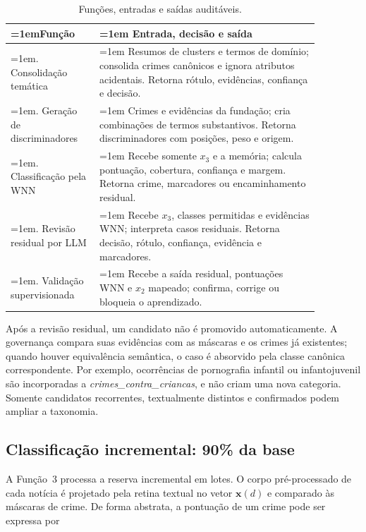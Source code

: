 \begin{table}[ht]
\centering
\caption{Funções, entradas e saídas auditáveis.}
\label{tab:funcoes-instrucoes}
\begin{tabular}{>{\hyphenpenalty=10000\exhyphenpenalty=10000\emergencystretch=1em\arraybackslash}p{0.25\linewidth}>{\hyphenpenalty=10000\exhyphenpenalty=10000\emergencystretch=1em\arraybackslash}p{0.62\linewidth}}
\hline
\textbf{Função} & \textbf{Entrada, decisão e saída} \\
\hline
1. Consolidação temática & Resumos de clusters e termos de domínio; consolida crimes canônicos e ignora atributos acidentais. Retorna rótulo, evidências, confiança e decisão. \\
2. Geração de discriminadores & Crimes e evidências da fundação; cria combinações de termos substantivos. Retorna discriminadores com posições, peso e origem. \\
3. Classificação pela WNN & Recebe somente $x_3$ e a memória; calcula pontuação, cobertura, confiança e margem. Retorna crime, marcadores ou encaminhamento residual. \\
4. Revisão residual por LLM & Recebe $x_3$, classes permitidas e evidências WNN; interpreta casos residuais. Retorna decisão, rótulo, confiança, evidência e marcadores. \\
5. Validação supervisionada & Recebe a saída residual, pontuações WNN e $x_2$ mapeado; confirma, corrige ou bloqueia o aprendizado. \\
\hline
\end{tabular}
\end{table}

Após a revisão residual, um candidato não é promovido automaticamente. A governança compara suas evidências com as máscaras e os crimes já existentes; quando houver equivalência semântica, o caso é absorvido pela classe canônica correspondente. Por exemplo, ocorrências de pornografia infantil ou infantojuvenil são incorporadas a \textit{crimes\_contra\_criancas}, e não criam uma nova categoria. Somente candidatos recorrentes, textualmente distintos e confirmados podem ampliar a taxonomia.

\subsection{Classificação incremental: 90\% da base}

A Função~3 processa a reserva incremental em lotes. O corpo pré-processado de cada notícia é projetado pela retina textual no vetor $\mathbf{x}(d)$ e comparado às máscaras de crime. De forma abstrata, a pontuação de um crime pode ser expressa por

